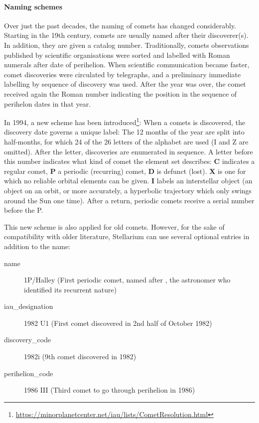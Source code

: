 \paragraph{Naming schemes}
Over just the past decades, the naming of comets has changed considerably. 
Starting in the 19th century, comets are usually named after their discoverer(s). 
In addition, they are given a catalog number. 
Traditionally, comets observations published by scientific organisations were sorted and labelled with Roman numerals after date of perihelion. 
When scientific communication became faster, comet discoveries were circulated by telegraphs, and a preliminary immediate labelling by sequence of discovery was used. 
After the year was over, the comet received again the Roman number indicating the position in the sequence of perihelon dates in that year. 

In 1994, a new scheme has been introduced\footnote{\url{https://minorplanetcenter.net/iau/lists/CometResolution.html}}: 
When a comets is discovered, the discovery date governs a unique label: 
The 12 months of the year are split into half-months, for which 24 of the 26 letters of the alphabet are used (I and Z are omitted). 
After the letter, discoveries are enumerated in sequence. 
A letter before this number indicates what kind of comet the element set describes: \textbf{C} indicates a regular comet, 
\textbf{P} a periodic (recurring) comet, \textbf{D} is defunct (lost). \textbf{X} is one for which no reliable orbital elements can be given. 
\textbf{I} labels an interstellar object (an object on an orbit, or more accurately, a hyperbolic trajectory which only swings around the Sun one time).
After a return, periodic comets receive a serial number before the P.

This new scheme is also applied for old comets. However, for the sake of compatibility with older literature, 
Stellarium can use several optional entries in addition to the name:
\begin{description}
\item[name] 1P/Halley (First periodic comet, named after , the astronomer who identified its recurrent nature)
\item[iau\_designation] 1982 U1 (First comet discovered in 2nd half of October 1982)
\item[discovery\_code] 1982i (9th comet discovered in 1982)
\item[perihelion\_code] 1986 III (Third comet to go through perihelion in 1986)
\end{description}

